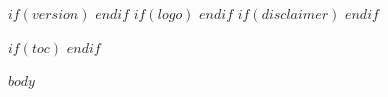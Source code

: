 \documentclass[$if(fontsize)$$fontsize$$else$11pt$endif$]{article}
\begin{document}
\newcommand{\doctitle}{$title$}
\newcommand{\docauthor}{$author$}
\newcommand{\docdate}{$date$}
$if(version)$
\newcommand{\docversion}{$version$}
$endif$
$if(logo)$
\newcommand{\doclogo}{$logo$}
$endif$
$if(disclaimer)$
\newcommand{\docdisclaimer}{$disclaimer$}
$endif$
\newcommand{\doclogowidth}{$if(logo-width)$$logo-width$$else$0.8$endif$}
\newcommand{\doctppostrule}{$if(titlepage-post-rule)$$titlepage-post-rule$$else$2em$endif$}
\newcommand{\doctpposttitle}{$if(titlepage-post-title)$$titlepage-post-title$$else$0.75em$endif$}
\newcommand{\doctppostauthor}{$if(titlepage-post-author)$$titlepage-post-author$$else$0.5em$endif$}
\newcommand{\doctppostdate}{$if(titlepage-post-date)$$titlepage-post-date$$else$3em$endif$}


$if(toc)$
\renewcommand{\contentsname}{Table of Contents}
\setcounter{tocdepth}{$if(toc-depth)$$toc-depth$$else$3$endif$}
\tableofcontents
\newpage
$endif$

$body$
\end{document}
